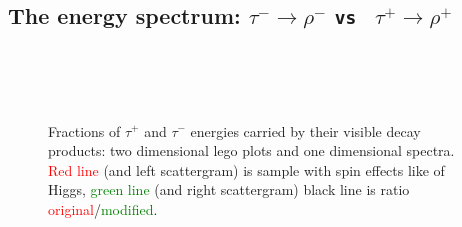 \newpage
\subsection{The energy spectrum: $\tau^- \to \rho^-$ {\tt vs } $\tau^+ \to \rho^+$}
\vspace{1\baselineskip}

\begin{figure}[h!]
\centering
{}
 \\
 \\
 \\
\caption{\small Fractions of  $\tau^+$ and $\tau^-$ energies carried by their visible  decay products:
two dimensional lego plots and one dimensional spectra.
\textcolor{red}{Red line} (and left scattergram) is sample with spin effects like of Higgs,
\textcolor{green}{green line} (and right scattergram) \greenlineis
black line is ratio \textcolor{red}{original}/\textcolor{green}{modified}.
}
\end{figure}
